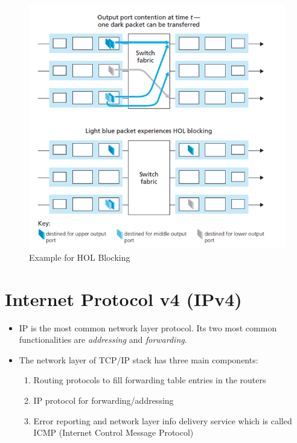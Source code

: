 \documentclass[a4paper]{article}
\theoremstyle{plain}
\theoremstyle{definition}
\begin{document}
\begin{figure}[!ht]
    \centering
    \includegraphics[scale=0.7]{cn4.png}
    \caption{Example for HOL Blocking}
    \label{fig:my_label_4}
\end{figure}

\section{Internet Protocol v4 (IPv4)}
\begin{itemize}
    \item IP is the most common network layer protocol. Its two most common functionalities are \textit{addressing} and \textit{forwarding}. 
    
    \item The network layer of TCP/IP stack has three main components: \begin{enumerate}
        \item Routing protocols to fill forwarding table entries in the routers
        
        \item IP protocol for forwarding/addressing 
        
        \item Error reporting and network layer info delivery service which is called ICMP (Internet Control Message Protocol)
    \end{enumerate}
\end{itemize}
\end{document}
